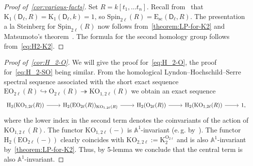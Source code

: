 \documentclass[oneside, 11pt]{amsart} \pdfoutput=1
\newcommand{\K}{{\mathrm{K}}}
\newcommand{\E}{\mathrm{E}}
\numberwithin{equation}{section}
\theoremstyle{definition}
\newcommand{\rD}{\mathsf{D}}
\begin{document}
\begin{proof}[Proof of~\cref{cor:various-facts}]
  Set $R = k[t_1,\ldots t_n]$. Recall from~\cite{Abe83} that $\K_1(\rD_\ell, R) = \K_1(\rD_\ell, k) = 1$, so $\mathrm{Spin}_{2\ell}(R) = \E_\mathrm{sc}(\rD_\ell, R)$. The presentation a la Steinberg for $\mathrm{Spin}_{2\ell}(R)$ now follows from~\cref{theorem:LP-for-K2} and Matsumoto's theorem~\cite[Theorem~5.10]{Ma69}. The formula for the second homology group follows from~\eqref{eq:H2-K2}. \end{proof}
 
 \begin{proof}[Proof of~\cref{cor:H_2-O}]
  We will give the proof for~\eqref{eq:H_2-O}, the proof for~\eqref{eq:H_2-SO} being similar.
  From the homological Lyndon--Hochschild--Serre spectral sequence associated with the short exact sequence $\mathrm{EO}_{2\ell}(R) \hookrightarrow \mathrm{O}_{2\ell}(R) \twoheadrightarrow \mathrm{KO}_{1, 2\ell}(R)$ we obtain an exact sequence
  \[ \begin{tikzcd} \mathrm H_3(\mathrm{KO}_{1,2\ell}(R)) \ar[r] & \mathrm H_2(\mathrm{EO}_{2\ell}(R))_{\mathrm{KO}_{1,2\ell}(R)} \ar[r] & \mathrm H_2(\mathrm{O}_{2\ell}(R)) \ar[r] &  \mathrm H_2(\mathrm{KO}_{1, 2\ell}(R)) \ar[r] & 1, \end{tikzcd} \]
  where the lower index in the second term denotes the coinvariants of the action of $\mathrm{KO}_{1,2\ell}(R)$.
  The functor $\mathrm{KO}_{1, 2\ell}(-)$ is $\mathbb{A}^1$-invariant (e.\,g. by~\cite[Theorem~1.1]{Sta20}).
  The functor $\mathrm H_2(\mathrm{EO}_{2\ell}(-))$ clearly coincides with $\mathrm{KO}_{2, 2\ell} := \K_2^{\mathrm O_{2\ell}}$ and is also $\mathbb{A}^1$-invariant by~\cref{theorem:LP-for-K2}. Thus, by 5-lemma we conclude that the central term is also $\mathbb{A}^1$-invariant.
 \end{proof}
 
\end{document}
